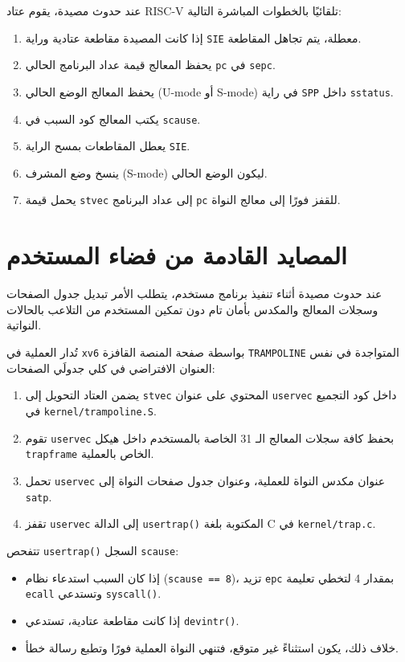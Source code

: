 عند حدوث مصيدة، يقوم عتاد RISC-V تلقائيًا بالخطوات المباشرة التالية:
\begin{enumerate}
  \item إذا كانت المصيدة مقاطعة عتادية وراية \texttt{SIE} معطلة، يتم تجاهل المقاطعة.
  \item يحفظ المعالج قيمة عداد البرنامج الحالي \texttt{pc} في \texttt{sepc}.
  \item يحفظ المعالج الوضع الحالي (U-mode أو S-mode) في راية \texttt{SPP} داخل \texttt{sstatus}.
  \item يكتب المعالج كود السبب في \texttt{scause}.
  \item يعطل المقاطعات بمسح الراية \texttt{SIE}.
  \item ينسخ وضع المشرف (S-mode) ليكون الوضع الحالي.
  \item يحمل قيمة \texttt{stvec} إلى عداد البرنامج \texttt{pc} للقفز فورًا إلى معالج النواة.
\end{enumerate}

\section{المصايد القادمة من فضاء المستخدم}
\label{sec:traps_user_space}

عند حدوث مصيدة أثناء تنفيذ برنامج مستخدم، يتطلب الأمر تبديل جدول الصفحات وسجلات المعالج والمكدس بأمان تام دون تمكين المستخدم من التلاعب بالحالات النواتية.

تُدار العملية في \texttt{xv6} بواسطة صفحة المنصة القافزة \texttt{TRAMPOLINE} المتواجدة في نفس العنوان الافتراضي في كلي جدولَي الصفحات:
\begin{enumerate}
  \item يضمن العتاد التحويل إلى \texttt{stvec} المحتوي على عنوان \texttt{uservec} داخل كود التجميع في \texttt{kernel/trampoline.S}.
  \item تقوم \texttt{uservec} بحفظ كافة سجلات المعالج الـ 31 الخاصة بالمستخدم داخل هيكل \texttt{trapframe} الخاص بالعملية.
  \item تحمل \texttt{uservec} عنوان مكدس النواة للعملية، وعنوان جدول صفحات النواة إلى \texttt{satp}.
  \item تقفز \texttt{uservec} إلى الدالة \texttt{usertrap()} المكتوبة بلغة C في \texttt{kernel/trap.c}.
\end{enumerate}

تتفحص \texttt{usertrap()} السجل \texttt{scause}:
\begin{itemize}
  \item إذا كان السبب استدعاء نظام (\texttt{scause == 8})، تزيد \texttt{epc} بمقدار 4 لتخطي تعليمة \texttt{ecall} وتستدعي \texttt{syscall()}.
  \item إذا كانت مقاطعة عتادية، تستدعي \texttt{devintr()}.
  \item خلاف ذلك، يكون استثناءً غير متوقع، فتنهي النواة العملية فورًا وتطبع رسالة خطأ.
\end{itemize}

